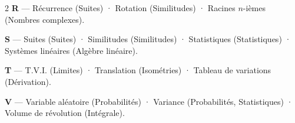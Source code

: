 \begin{multicols}{2}
\textbf{R} — Récurrence (Suites) · Rotation (Similitudes) · Racines $n$-ièmes (Nombres complexes).\par
\textbf{S} — Suites (Suites) · Similitudes (Similitudes) · Statistiques (Statistiques) · Systèmes linéaires (Algèbre linéaire).\par
\textbf{T} — T.V.I. (Limites) · Translation (Isométries) · Tableau de variations (Dérivation).\par
\textbf{V} — Variable aléatoire (Probabilités) · Variance (Probabilités, Statistiques) · Volume de révolution (Intégrale).\par
\end{multicols}
